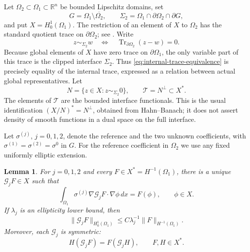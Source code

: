 \documentclass[10pt,a4paper]{amsart}
\newtheorem{lemma}[theorem]{Lemma}
\newcommand{\R}{\mathbb R}
\begin{document}
Let \(\Omega_2\subset\Omega_1\subset\R^n\) be bounded Lipschitz domains, set
\begin{equation}
  G=\Omega_1\setminus\overline{\Omega_2},
  \qquad
  \Sigma_2=\Omega_1\cap\partial\Omega_2\cap\partial G,
\end{equation}
and put \(X=H^1_0(\Omega_1)\).  The restriction of an element of \(X\) to
\(\Omega_2\) has the standard quotient trace on \(\partial\Omega_2\); see
\cite[Chapters 3--4]{McLean2000}.  Write
\begin{equation}
  z\sim_{\Sigma_2}w
  \quad\Longleftrightarrow\quad
  \operatorname{Tr}_{\partial\Omega_2}(z-w)=0.
  \label{eq:internal-trace-equivalence}
\end{equation}
Because global elements of \(X\) have zero trace on \(\partial\Omega_1\), the
only variable part of this trace is the clipped interface \(\Sigma_2\).  Thus
\eqref{eq:internal-trace-equivalence} is precisely equality of the internal
trace, expressed as a relation between actual global representatives.  Let
\begin{equation}
  N=\{z\in X:z\sim_{\Sigma_2}0\},
  \qquad
  \mathcal T=N^\perp\subset X^*.
  \label{eq:interface-annihilator}
\end{equation}
The elements of \(\mathcal T\) are the bounded interface functionals.  This is
the usual identification \((X/N)^*=N^\perp\), obtained from Hahn--Banach; it
does not assert density of smooth functions in a dual space on the full
interface.

Let \(\sigma^{(j)}\), \(j=0,1,2\), denote the reference and the two unknown
coefficients, with \(\sigma^{(1)}=\sigma^{(2)}=\sigma^0\) in \(G\).  For the
reference coefficient in \(\Omega_2\) we use any fixed uniformly elliptic
extension.

\begin{lemma}
\label{lem:variational-green-sources}
For \(j=0,1,2\) and every \(F\in X^*=H^{-1}(\Omega_1)\), there is a unique
\(\mathcal G_jF\in X\) such that
\begin{equation}
  \int_{\Omega_1}\sigma^{(j)}\nabla\mathcal G_jF\cdot\nabla\phi\,dx
  =F(\phi),
  \qquad \phi\in X.
  \label{eq:variational-green}
\end{equation}
If \(\lambda_j\) is an ellipticity lower bound, then
\begin{equation}
  \|\mathcal G_jF\|_{H^1_0(\Omega_1)}
  \le C\lambda_j^{-1}\|F\|_{H^{-1}(\Omega_1)}.
  \label{eq:green-coercive-estimate}
\end{equation}
Moreover, each \(\mathcal G_j\) is symmetric:
\begin{equation}
  H(\mathcal G_jF)=F(\mathcal G_jH),
  \qquad F,H\in X^*.
  \label{eq:green-symmetry}
\end{equation}
\end{lemma}
\end{document}
